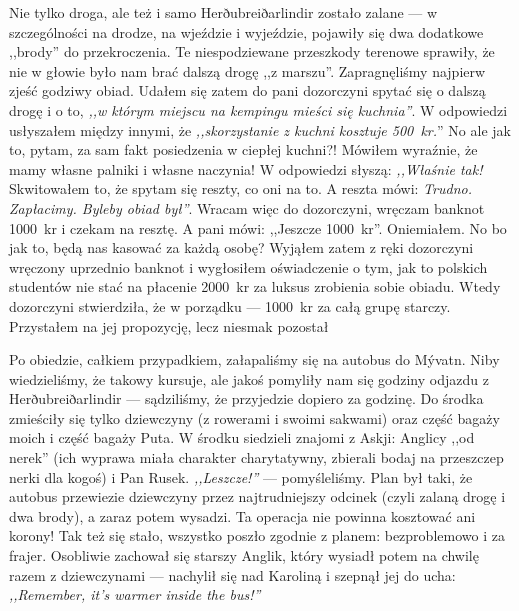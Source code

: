 
Nie tylko droga, ale też i samo Herðubreiðarlindir zostało zalane --- w szczególności na drodze, na wjeździe i wyjeździe, pojawiły się dwa dodatkowe ,,brody'' do przekroczenia. Te niespodziewane przeszkody terenowe sprawiły, że nie w głowie było nam brać dalszą drogę ,,z marszu''. Zapragnęliśmy najpierw zjeść godziwy obiad. Udałem się zatem do pani dozorczyni spytać się o dalszą drogę i o to, \emph{,,w którym miejscu na kempingu mieści się kuchnia''}. W odpowiedzi usłyszałem między innymi, że \emph{,,skorzystanie z kuchni kosztuje 500~kr.}'' No ale jak to, pytam, za sam fakt posiedzenia w ciepłej kuchni?! Mówiłem wyraźnie, że mamy własne palniki i własne naczynia! W odpowiedzi słyszą: \emph{,,Właśnie tak!} Skwitowałem to, że spytam się reszty, co oni na to. A reszta mówi: \emph{Trudno. Zapłacimy. Byleby obiad był\textellipsis''}. Wracam więc do dozorczyni, wręczam banknot 1000~kr i czekam na resztę. A pani mówi: ,,Jeszcze 1000~kr''. Oniemiałem. No bo jak to, będą nas kasować za każdą osobę? Wyjąłem zatem z ręki dozorczyni wręczony uprzednio banknot i wygłosiłem oświadczenie o tym, jak to polskich studentów nie stać na płacenie 2000~kr za luksus zrobienia sobie obiadu. Wtedy dozorczyni stwierdziła, że w porządku --- 1000~kr za całą grupę starczy. Przystałem na jej propozycję, lecz niesmak pozostał\textellipsis

Po obiedzie, całkiem przypadkiem, załapaliśmy się na autobus do Mývatn. Niby wiedzieliśmy, że takowy kursuje, ale jakoś pomyliły nam się godziny odjazdu z Herðubreiðarlindir --- sądziliśmy, że przyjedzie dopiero za godzinę. Do środka zmieściły się tylko dziewczyny (z rowerami i swoimi sakwami) oraz część bagaży moich i część bagaży Puta. W środku siedzieli znajomi z Askji: Anglicy ,,od nerek'' (ich wyprawa miała charakter charytatywny, zbierali bodaj na przeszczep nerki dla kogoś) i Pan Rusek. \emph{,,Leszcze!''} --- pomyśleliśmy. Plan był taki, że autobus przewiezie dziewczyny przez najtrudniejszy odcinek (czyli zalaną drogę i dwa brody), a zaraz potem wysadzi. Ta operacja nie powinna kosztować ani korony! Tak też się stało, wszystko poszło zgodnie z planem: bezproblemowo i za frajer. Osobliwie zachował się starszy Anglik, który wysiadł potem na chwilę razem z dziewczynami --- nachylił się nad Karoliną i szepnął jej do ucha: \emph{,,Remember, it’s warmer inside the bus!''}

